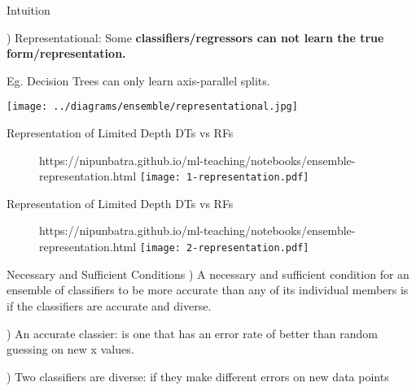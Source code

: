 \documentclass{beamer}
\begin{document}
\begin{frame}{Intuition}

  ) Representational: Some \textbf{classifiers/regressors can not learn the true form/representation.}

  \pause Eg. Decision Trees can only learn axis-parallel splits.

  \texttt{[image: ../diagrams/ensemble/representational.jpg]}


\end{frame}

\begin{frame}{Representation of Limited Depth DTs vs RFs}

\begin{figure}[htp]
  \centering
  \begin{notebookbox}{https://nipunbatra.github.io/ml-teaching/notebooks/ensemble-representation.html}
    \texttt{[image: 1-representation.pdf]}
  \end{notebookbox}
\end{figure}

\end{frame}
\begin{frame}{Representation of Limited Depth DTs vs RFs}

  \begin{figure}[htp]
    \centering
    \begin{notebookbox}{https://nipunbatra.github.io/ml-teaching/notebooks/ensemble-representation.html}
      \texttt{[image: 2-representation.pdf]}
    \end{notebookbox}
  \end{figure}
  
  \end{frame}




\begin{frame}{Necessary and Sufficient Conditions}
  ) A necessary and sufficient condition for an ensemble of classifiers to be more
  accurate than any of its individual members is if the classifiers are accurate and
  diverse.

  ) An accurate classier: \pause  is one that has an
  error rate of better than random guessing on new x values.

  ) Two classifiers are diverse: \pause  if they make different errors on new data points

\end{frame}
\end{document}
